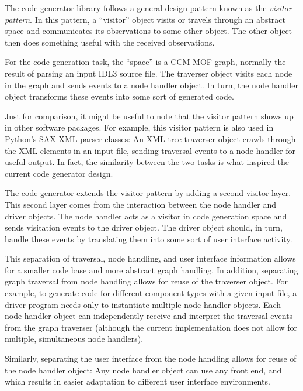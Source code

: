 The code generator library follows a general design pattern known as the {\em
visitor pattern\/}. In this pattern, a ``visitor'' object visits or travels
through an abstract space and communicates its observations to some other
object. The other object then does something useful with the received
observations.

For the code generation task, the ``space'' is a CCM MOF graph, normally the
result of parsing an input IDL3 source file. The traverser object visits each
node in the graph and sends events to a node handler object. In turn, the node
handler object transforms these events into some sort of generated code.

Just for comparison, it might be useful to note that the visitor pattern shows
up in other software packages. For example, this visitor pattern is also used in
Python's SAX XML parser classes: An XML tree traverser object crawls through the
XML elements in an input file, sending traversal events to a node handler for
useful output. In fact, the similarity between the two tasks is what inspired
the current code generator design.

The code generator extends the visitor pattern by adding a second visitor layer.
This second layer comes from the interaction between the node handler and driver
objects. The node handler acts as a visitor in code generation space and sends
visitation events to the driver object. The driver object should, in turn,
handle these events by translating them into some sort of user interface
activity.

This separation of traversal, node handling, and user interface information
allows for a smaller code base and more abstract graph handling. In addition,
separating graph traversal from node handling allows for reuse of the traverser
object. For example, to generate code for different component types with a given
input file, a driver program needs only to instantiate multiple node handler
objects. Each node handler object can independently receive and interpret the
traversal events from the graph traverser (although the current implementation
does not allow for multiple, simultaneous node handlers).

Similarly, separating the user interface from the node handling allows for reuse
of the node handler object: Any node handler object can use any front end, and
which results in easier adaptation to different user interface environments.

